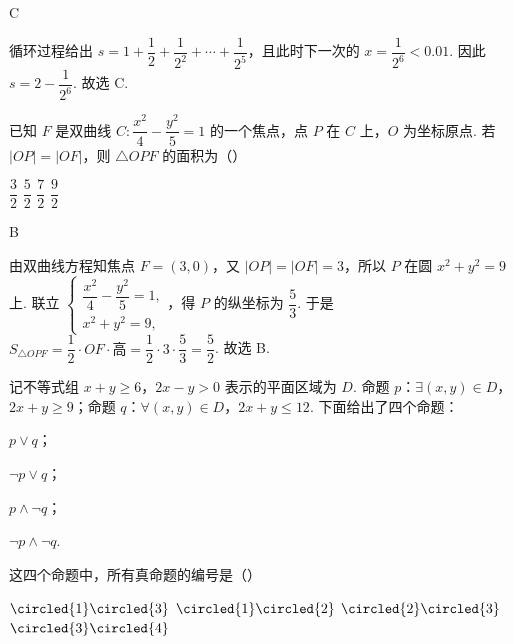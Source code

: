 \begin{answer}
C
\end{answer}

\begin{solution}
循环过程给出 \(s=1+\dfrac12+\dfrac1{2^2}+\cdots+\dfrac1{2^5}\)，且此时下一次的 \(x=\dfrac1{2^6}<0.01\). 因此 \(s=2-\dfrac1{2^6}\). 故选 C.
\end{solution}

\begin{problem}
已知 \(F\) 是双曲线 \(C:\dfrac{x^2}{4}-\dfrac{y^2}{5}=1\) 的一个焦点，点 \(P\) 在 \(C\) 上，\(O\) 为坐标原点. 若 \(|OP|=|OF|\)，则 \(\triangle OPF\) 的面积为（\quad）


\choices
    {\(\dfrac32\)}
    {\(\dfrac52\)}
    {\(\dfrac72\)}
    {\(\dfrac92\)}
\end{problem}

\begin{answer}
B
\end{answer}

\begin{solution}
由双曲线方程知焦点 \(F=(3,0)\)，又 \(|OP|=|OF|=3\)，所以 \(P\) 在圆 \(x^2+y^2=9\) 上. 联立 \(\begin{cases}
\dfrac{x^2}{4}-\dfrac{y^2}{5}=1,\\
x^2+y^2=9,
\end{cases}\)，得 \(P\) 的纵坐标为 \(\dfrac53\). 于是 \(S_{\triangle OPF}=\dfrac12\cdot OF\cdot \text{高}=\dfrac12\cdot3\cdot\dfrac53=\dfrac52\). 故选 B.
\end{solution}

\begin{problem}
记不等式组 \(x+y\ge6\)，\(2x-y>0\) 表示的平面区域为 \(D\). 命题 \(p\)：\(\exists (x,y)\in D\)，\(2x+y\ge9\)；命题 \(q\)：\(\forall (x,y)\in D\)，\(2x+y\le12\). 下面给出了四个命题：

\begin{circlelist}
\item \(p\vee q\)；
\item \(\neg p\vee q\)；
\item \(p\wedge\neg q\)；
\item \(\neg p\wedge\neg q\).
\end{circlelist}

这四个命题中，所有真命题的编号是（\quad）

\choices
    {\(\circled{1}\circled{3}\)}
    {\(\circled{1}\circled{2}\)}
    {\(\circled{2}\circled{3}\)}
    {\(\circled{3}\circled{4}\)}
\end{problem}

